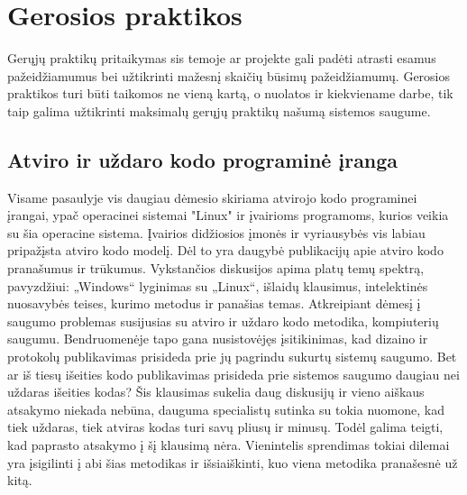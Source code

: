 \documentclass[a4paper,12pt,fleqn]{article}
\begin{document}
\newpage
\section{Gerosios praktikos}
\label{sec:goodpractices}

Gerųjų praktikų pritaikymas sis temoje ar projekte gali padėti atrasti esamus pažeidžiamumus bei užtikrinti mažesnį skaičių būsimų pažeidžiamumų. Gerosios praktikos turi būti taikomos ne vieną kartą, o nuolatos ir kiekviename darbe, tik taip galima užtikrinti maksimalų gerųjų praktikų našumą sistemos saugume.

\subsection{Atviro ir uždaro kodo programinė įranga}
\label{sec:example}

Visame pasaulyje vis daugiau dėmesio skiriama atvirojo kodo programinei įrangai, ypač operacinei sistemai "Linux" ir įvairioms programoms, kurios veikia su šia operacine sistema. Įvairios didžiosios įmonės ir vyriausybės vis labiau pripažįsta atviro kodo modelį. Dėl to yra daugybė publikacijų apie atviro kodo pranašumus ir trūkumus. Vykstančios diskusijos apima platų temų spektrą, pavyzdžiui: „Windows“ lyginimas su „Linux“, išlaidų klausimus, intelektinės nuosavybės teises, kurimo metodus ir panašias temas. Atkreipiant dėmesį į saugumo problemas susijusias su atviro ir uždaro kodo metodika, kompiuterių saugumu. Bendruomenėje tapo gana nusistovėjęs įsitikinimas, kad dizaino ir protokolų publikavimas prisideda prie jų pagrindu sukurtų sistemų saugumo\cite{hoepman2008increased}. Bet ar iš tiesų išeities kodo publikavimas prisideda prie sistemos saugumo daugiau nei uždaras išeities kodas? Šis klausimas sukelia daug diskusijų ir vieno aiškaus atsakymo niekada nebūna, dauguma specialistų sutinka su tokia nuomone, kad tiek uždaras, tiek atviras kodas turi savų pliusų ir minusų. Todėl galima teigti, kad paprasto atsakymo į šį klausimą nėra. Vienintelis sprendimas tokiai dilemai yra įsigilinti į abi šias metodikas ir išsiaiškinti, kuo viena metodika pranašesnė už kitą.
\end{document}
